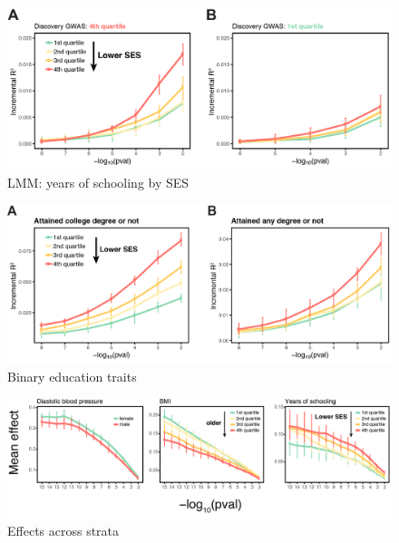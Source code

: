 \documentclass[hidelinks, 12pt]{article}
\begin{document}
\begin{figure}[h!]
\includegraphics[width=\textwidth]{./supp_figures/bolt_eduyears.png}
\caption{LMM: years of schooling by SES}
\centering
\end{figure}

\begin{figure}[h!]
\centering
\includegraphics[width=\textwidth]{./supp_figures/binary_edu_traits.png}
\caption{Binary education traits}
\end{figure}

\begin{figure}[h!]
\centering
\includegraphics[width=\textwidth]{./supp_figures/beta_sweep.png}
\caption{Effects across strata}
\end{figure}
\end{document}

